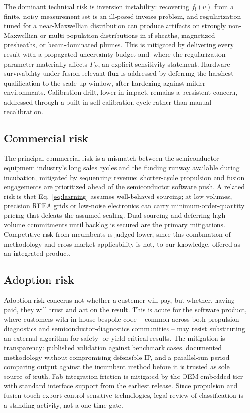 The dominant technical risk is inversion instability: recovering $f_{\mathrm{i}}(v)$ from a finite, noisy measurement set is an ill-posed inverse problem, and regularization tuned for a near-Maxwellian distribution can produce artifacts on strongly non-Maxwellian or multi-population distributions in rf sheaths, magnetized presheaths, or beam-dominated plumes. This is mitigated by delivering every result with a propagated uncertainty budget and, where the regularization parameter materially affects $\Gamma_{E}$, an explicit sensitivity statement. Hardware survivability under fusion-relevant flux is addressed by deferring the harshest qualification to the scale-up window, after hardening against milder environments. Calibration drift, lower in impact, remains a persistent concern, addressed through a built-in self-calibration cycle rather than manual recalibration.

\subsection{Commercial risk}

The principal commercial risk is a mismatch between the semiconductor-equipment industry's long sales cycles and the funding runway available during incubation, mitigated by sequencing revenue: shorter-cycle propulsion and fusion engagements are prioritized ahead of the semiconductor software push. A related risk is that Eq.~\eqref{eq:learning} assumes well-behaved sourcing; at low volumes, precision RFEA grids or low-noise electronics can carry minimum-order-quantity pricing that defeats the assumed scaling. Dual-sourcing and deferring high-volume commitments until backlog is secured are the primary mitigations. Competitive risk from incumbents is judged lower, since this combination of methodology and cross-market applicability is not, to our knowledge, offered as an integrated product.

\subsection{Adoption risk}

Adoption risk concerns not whether a customer will pay, but whether, having paid, they will trust and act on the result. This is acute for the software product, where customers with in-house bespoke code -- common across both propulsion-diagnostics \cite{ref0506} and semiconductor-diagnostics \cite{ref0548} communities -- may resist substituting an external algorithm for safety- or yield-critical results. The mitigation is transparency: published validation against benchmark cases, documented methodology without compromising defensible IP, and a parallel-run period comparing output against the incumbent method before it is trusted as sole source of truth. Fab-integration friction is mitigated by the OEM-embedded tier with standard interface support from the earliest release. Since propulsion and fusion touch export-control-sensitive technologies, legal review of classification is a standing activity, not a one-time gate.

